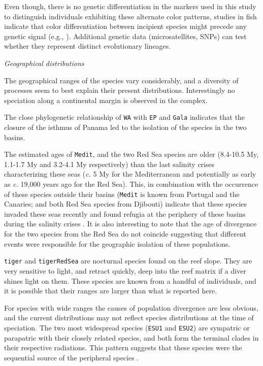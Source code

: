 \documentclass[12pt,letterpaper]{article}\usepackage[]{graphicx}\usepackage[]{color}
\renewcommand{\subsection}[1]{%
\bigskip
\begin{center}
\begin{large}
\normalfont\itshape #1
\end{large}
\end{center}}
\begin{document}

Even though, there is no genetic differentiation in the markers used in this
study to distinguish individuals exhibiting these alternate color patterns,
studies in fish indicate that color differentiation between incipient species
might precede any genetic signal (e.g., \citep{McMillan1999,
  Gaither2014}). Additional genetic data (microsatellites, SNPs) can test
whether they represent distinct evolutionary lineages.


\subsection{Geographical distributions}

The geographical ranges of the species vary considerably, and a diversity of
processes seem to best explain their present distributions. Interestingly no
speciation along a continental margin is observed in the complex.

The close phylogenetic relationship of \texttt{WA} with \texttt{EP} and
\texttt{Gala} indicates that the closure of the isthmus of Panama led to the
isolation of the species in the two basins.

The estimated ages of \texttt{Medit}, and the two Red Sea species are older
(8.4-10.5 My, 1.1-1.7 My and 3.2-4.1 My respectively) than the last salinity
crises characterizing these seas (\textit{c.} 5 My for the Mediterranean
\citep{Hernandez-Molina2014} and potentially as early as \textit{c.} 19,000 years
ago for the Red Sea). This, in combination with the occurrence of these species
outside their basins (\texttt{Medit} is known from Portugal and the Canaries;
and both Red Sea species from Djibouti) indicate that these species invaded
these seas recently and found refugia at the periphery of these basins during
the salinity crises \citep{DiBattista2013}. It is also interesting to note that
the age of divergence for the two species from the Red Sea do not coincide
suggesting that different events were responsible for the geographic isolation
of these populations.

\texttt{tiger} and \texttt{tigerRedSea} are nocturnal species found on the reef
slope. They are very sensitive to light, and retract quickly, deep into the reef
matrix if a diver shines light on them. These species are known from a handful
of individuals, and it is possible that their ranges are larger than what is
reported here.

For species with wide ranges the causes of population divergence are less
obvious, and the current distributions may not reflect species distributions at
the time of speciation. The two most widespread species (\texttt{ESU1} and
\texttt{ESU2}) are sympatric or parapatric with their closely related species,
and both form the terminal clades in their respective radiations. This pattern
suggests that these species were the sequential source of the peripheral species
\citep{Malay2010}.
\end{document}

